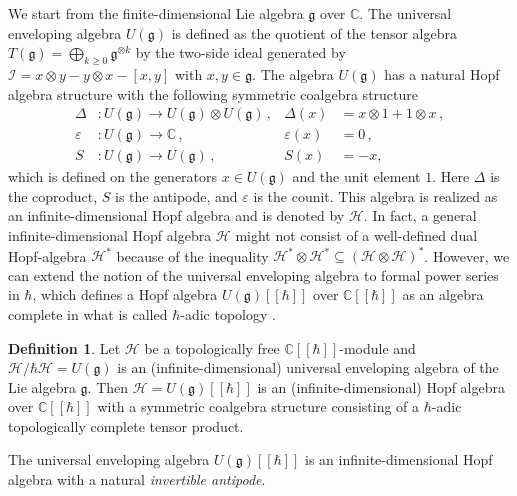 \documentclass[reqno]{amsart}
\theoremstyle{definition}
\newtheorem{definition}[formula]{Definition}
\theoremstyle{remark}
\begin{document}
We start from the finite-dimensional Lie algebra $\mathfrak{g}$ over $\mathbb{C}$. The universal enveloping algebra $U(\mathfrak{g})$ is defined as the quotient of the tensor algebra $T(\mathfrak{g}) = \displaystyle\bigoplus\limits_{k \geq 0} \mathfrak{g}^{\otimes k}$ by the two-side ideal generated by $\mathcal{I}=x\otimes y - y\otimes x -[x,y]$ with $x,y \in \mathfrak{g}$. The algebra $U(\mathfrak{g})$ has a natural Hopf algebra structure with the following symmetric coalgebra structure
\begin{align}
    \Delta &: U(\mathfrak{g}) \longrightarrow U(\mathfrak{g}) \otimes U(\mathfrak{g}) \,, & \Delta(x) &= x \otimes 1 + 1 \otimes x \,, \nonumber \\[1ex]
\varepsilon &: U(\mathfrak{g}) \longrightarrow \mathbb{C} \,, & \varepsilon(x) &= 0 \,, \\[1ex]
S &: U(\mathfrak{g}) \longrightarrow U(\mathfrak{g}) \,, & S(x) &= -x,\nonumber
\end{align}
which is defined on the generators $x \in U(\mathfrak{g})$ and the unit element $1$. Here $\Delta$ is the coproduct, $S$ is the antipode, and $\varepsilon$ is the counit. This algebra is realized as an infinite-dimensional Hopf algebra and is denoted by $\mathscr{H}$. In fact, a general infinite-dimensional Hopf algebra $\mathscr{H}$ might not consist of a well-defined dual Hopf-algebra $\mathscr{H}^*$ because of the inequality $\mathscr{H}^* \otimes \mathscr{H}^*  \subseteq \left(\mathscr{H}\otimes \mathscr{H}\right)^*$. However, we can extend the notion of the universal enveloping algebra to formal power series in $\hbar$, which defines a Hopf algebra $U(\mathfrak{g})[[\hbar]]$ over $\mathbb{C}[[\hbar]]$ as an algebra complete in what is called $\hbar$-adic topology \cite{Dr3}.

\begin{definition}
    Let $\mathscr{H}$ be a topologically free $\mathbb{C}[[\hbar]]$-module and $\mathscr{H}/\hbar\mathscr{H} = U(\mathfrak{g})$ is an (infinite-dimensional) universal enveloping algebra of the Lie algebra $\mathfrak{g}$. Then $\mathscr{H}=U(\mathfrak{g})[[\hbar]]$ is an (infinite-dimensional) Hopf algebra over $\mathbb{C}[[\hbar]]$ with a symmetric coalgebra structure consisting of a $\hbar$-adic topologically complete tensor product.
\end{definition}
The universal enveloping algebra $U(\mathfrak{g})[[\hbar]]$ is an infinite-dimensional Hopf algebra with a natural \textit{invertible antipode}. 
\end{document}
